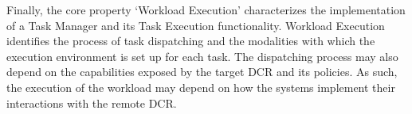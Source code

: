 \documentclass{sig-alternate}
\begin{document}
Finally, the core property `Workload Execution' characterizes the implementation
of a Task Manager and its Task Execution functionality. Workload Execution
identifies the process of task dispatching and the modalities with which the
execution environment is set up for each task. The dispatching process may also
depend on the capabilities exposed by the target DCR and its policies. As such,
the execution of the workload may depend on how the \pilot systems implement
their interactions with the remote DCR.


\end{document}
